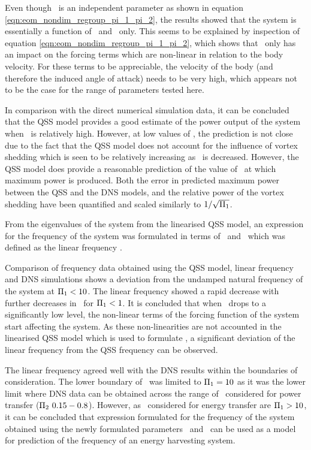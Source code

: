 Even though \mstar\ is an independent parameter as shown in equation \ref{eqn:eom_nondim_regroup_pi_1_pi_2}, the results showed that the system is essentially a function of \massstiff\ and \massdamp\ only.  This seems to be explained by inspection of  equation \ref{eqn:eom_nondim_regroup_pi_1_pi_2}, which shows that \mstar\ only has an impact on the forcing terms which are non-linear in relation to the body velocity. For these terms to be appreciable, the velocity of the body (and therefore the induced angle of attack) needs to be very high, which appears not to be the case for the range of parameters tested here. 

In comparison with the direct numerical simulation data, it can be concluded that the QSS model provides a good estimate of the power output of the system when \massstiff\ is relatively high. However, at low values of \massstiff, the prediction is not close due to the fact that the QSS model does not account for the influence of vortex shedding which is seen to be relatively increasing as \massstiff\ is decreased. However, the QSS model does provide a reasonable prediction of the value of \massdamp\ at which maximum power is produced. Both the error in predicted maximum power between the QSS and the DNS models, and the relative power of the vortex shedding have been quantified and scaled similarly to $1/\sqrt{\Pi_1}$.

From the eigenvalues of the system from the linearised QSS model, an expression for the frequency of the system was formulated in terms of \massstiff\ and \massdamp\ which was defined as the linear frequency \freqlin.

Comparison of frequency data obtained using the QSS model, linear frequency and DNS simulations shows a deviation from the undamped natural frequency of the system at $\Pi_1<10$. The linear frequency showed a rapid decrease with further decreases in \massstiff\ for $\Pi_1<1$. It is concluded that when \massstiff\ drops to a significantly low level, the non-linear terms of the forcing function of the system start affecting the system. As these non-linearities are not accounted in the linearised QSS model which is used to formulate \freqlin, a significant deviation of the linear frequency from the QSS frequency can be observed.

The linear frequency agreed well with the DNS results within the boundaries of consideration. The lower boundary of \massstiff\ was limited to $\Pi_1=10$ as it was the lower limit where DNS data can be obtained across the range of \massdamp\ considered for power transfer ($\Pi_2\ 0.15-0.8$). However, as \massstiff\ considered for energy transfer are $\Pi_1>10$, it can be concluded that expression formulated for the frequency of the system obtained using the newly formulated parameters \massstiff\ and \massdamp\ can be used as a model for prediction of the frequency of an energy harvesting system.  
 
 









